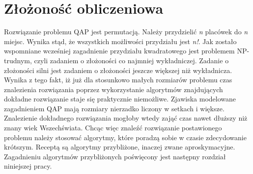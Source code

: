 \section{Złożoność obliczeniowa}
Rozwiązanie problemu QAP jest permutacją. Należy przydzielić \textit{n} placówek do \textit{n} miejsc. Wynika stąd, że wszystkich możliwości przydziału jest \textit{n!}. Jak zostało wspomniane wcześniej zagadnienie przydziału kwadratowego jest problemem NP-trudnym, czyli zadaniem o złożoności co najmniej wykładniczej. Zadanie o złożoności silni jest zadaniem o złożoności jeszcze większej niż wykładnicza. Wynika z tego fakt, iż już dla stosunkowo małych rozmiarów problemu czas znalezienia rozwiązania poprzez wykorzystanie algorytmów znajdujących dokładne rozwiązanie staje się praktycznie niemożliwe. Zjawiska modelowane zagadnieniem QAP mają rozmiary nierzadko liczony w setkach i większe. Znalezienie dokładnego rozwiązania mogłoby wtedy zająć czas nawet dłuższy niż znany wiek Wszechświata. Chcąc więc znaleźć rozwiązanie postawionego problemu należy stosować algorytmy, które poradzą sobie w czasie zdecydowanie krótszym. Receptą są algorytmy przybliżone, inaczej zwane aproskymacyjne. Zagadnieniu algorytmów przybliżonych poświęcony jest następny rozdział niniejszej pracy.